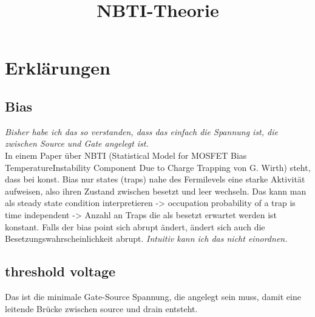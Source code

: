 \documentclass{article}
\begin{document}
\title{NBTI-Theorie}

\section{Erklärungen}
\subsection{Bias}
\textit{Bisher habe ich das so verstanden, dass das einfach die Spannung ist, die zwischen Source und Gate angelegt ist.} \\

\noindent
In einem Paper über NBTI (Statistical Model for MOSFET Bias TemperatureInstability Component Due to Charge Trapping von G. Wirth) steht, dass bei konst. Bias nur states (traps) nahe des Fermilevels eine starke Aktivität aufweisen, also ihren Zustand zwischen besetzt und leer wechseln. Das kann man als steady state condition interpretieren -> occupation probability of a trap is time independent -> Anzahl an Traps die als besetzt erwartet werden ist konstant. Falls der bias point sich abrupt ändert, ändert sich auch die Besetzungswahrscheinlichkeit abrupt.
\textit{Intuitiv kann ich das nicht einordnen.}

\subsection{threshold voltage}
Das ist die minimale Gate-Source Spannung, die angelegt sein muss, damit eine leitende Brücke zwischen source und drain entsteht.
\end{document}
